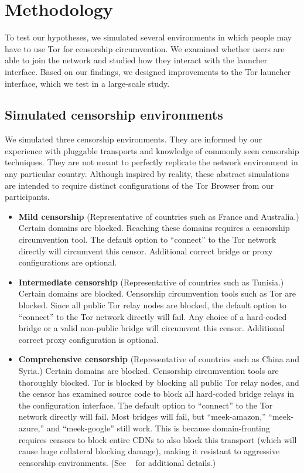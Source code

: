 \documentclass{template}
\begin{document}
\section{Methodology}

To test our hypotheses, we simulated several environments in which people may
have to use Tor for censorship circumvention. We examined whether users are able
to join the network and studied how they interact with the launcher interface.
Based on our findings, we designed improvements to the Tor launcher interface,
which we test in a large-scale study.

\subsection{Simulated censorship environments}
We simulated three censorship environments.
They are informed by our experience with pluggable transports
and knowledge of commonly seen censorship techniques.
They are not meant to perfectly replicate the network environment
in any particular country. Although inspired by reality, these
abstract simulations are intended to require distinct configurations
of the Tor Browser from our participants.

\begin{itemize} \itemsep1pt \parskip0pt 
\item {\bfseries Mild censorship} 
(Representative of countries such as France and Australia.)
Certain domains are blocked. Reaching these 
domains requires a censorship circumvention 
tool. The default option to ``connect'' to the Tor network 
directly will circumvent this censor. Additional correct
bridge or proxy configurations are optional. 

\item {\bfseries Intermediate censorship} 
(Representative of countries such as Tunisia.)
Certain domains are blocked. Censorship circumvention
tools such as Tor are blocked. Since all public Tor
relay nodes are blocked, the default option to ``connect'' to the Tor network
directly will fail. Any choice of a hard-coded bridge
or a valid non-public bridge will circumvent this censor.  
Additional correct proxy configuration is optional.

\item {\bfseries Comprehensive censorship} 
(Representative of countries such as China and Syria.)
Certain domains are blocked. Censorship circumvention tools
are thoroughly blocked. Tor is blocked by blocking all public
Tor relay nodes, and the censor has examined source code to block
all hard-coded bridge relays in the configuration interface. The default option
to ``connect'' to the Tor network directly will fail. Most bridges will fail,
but ``meek-amazon,'' ``meek-azure,'' and ``meek-google'' still work.
This is because domain-fronting requires censors to block entire CDNs to also
block this transport (which will cause huge collateral blocking damage), making
it resistant to aggressive censorship environments.
(See ~\cite{fifield2015blocking} for additional details.)\\
\end{itemize}
\end{document}
